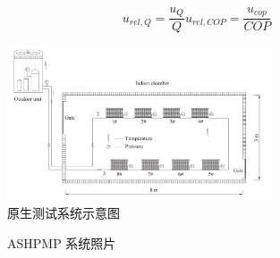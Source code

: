 \begin{equation}\label{E:6}
	u_{rel,Q} = \frac{u_Q}{Q} u_{rel,COP} = \frac{u_{cop}}{COP} 
\end{equation}

\begin{figure}[htbp]
	\centering
	\includegraphics[width=0.7\textwidth]{picture/picture_5}
	\caption{原生测试系统示意图}
	\label{F:5}
\end{figure}

\begin{figure}[h]
\centering  %
\caption{ASHPMP 系统照片}
\label{F:6}
\end{figure}

